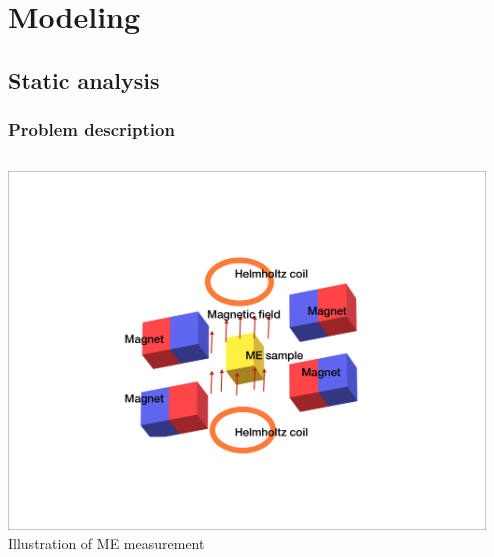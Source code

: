 \documentclass[compress]{beamer}
\begin{document}
\section{Modeling}
\subsection{Static analysis}

\begin{frame}\frametitle{Problem description}
\begin{columns}[totalwidth=\textwidth] 
   \begin{column}{.5\textwidth}
   \centering
	\includegraphics[width=0.99\textwidth]{Graphic/02_IllusMEmeasu.pdf}
 	Illustration of ME measurement
	\end{column}
	\begin{column}{.5\textwidth}
	\centering

\end{column}
\end{columns}
\end{frame}
\end{document}
